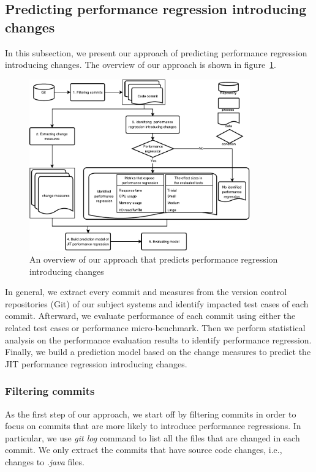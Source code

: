 \subsection{Predicting performance regression introducing changes}
In this subsection, we present our approach of predicting performance regression introducing changes. The overview of our approach is shown in figure~\ref{fig:workflow}.
\begin{figure}
	\centering
	\includegraphics[width=0.85\textwidth]{workflow.pdf}
	\centering \caption{An overview of our approach that predicts performance regression introducing changes}
	\label{fig:workflow}
\end{figure}
In general, we extract every commit and measures from the version control repositories (Git) of our subject systems and identify impacted test cases of each commit. Afterward, we evaluate performance of each commit using either the related test cases or performance micro-benchmark. Then we perform statistical analysis on the performance evaluation results to identify performance regression. Finally, we build a prediction model based on the change measures to predict the JIT performance regression introducing changes.

\subsubsection{Filtering commits}
As the first step of our approach, we start off by filtering commits in order to focus on commits that are more likely to introduce performance regressions. In particular, we use \emph{git log} command to list all the files that are changed in each commit. We only extract the commits that have source code changes, i.e., changes to \emph{$.$java} files. 

